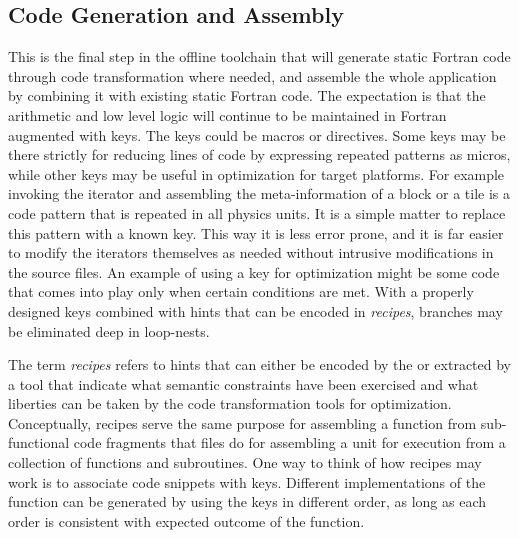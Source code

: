 \documentclass{article}
\begin{document}

\subsection{Code Generation and Assembly}
\label{sec:code-generation}

This is the final step in the offline toolchain that will generate
static Fortran code through code transformation where needed, and
assemble the whole application by combining it with existing static
Fortran code. The expectation is that the arithmetic and low level
logic will continue to be maintained in Fortran augmented with
keys. The keys could be macros or directives. Some keys may be there
strictly for reducing lines of code by expressing repeated patterns as
micros, while other keys may be useful in optimization for target
platforms. For example invoking the iterator and assembling the
meta-information of a block or a tile is a code pattern that is
repeated in all physics units. It is a simple matter to replace this
pattern with a known key. This way it is less error prone, and it is
far easier to modify the iterators themselves as needed without
intrusive modifications in the source files. An example of using a key
for optimization might be some code that comes into play only when
certain conditions are met. With a properly designed keys combined with
hints that can be encoded in {\it recipes}, branches may be eliminated
deep in loop-nests.

The term {\it recipes} refers to
hints that can either be encoded by the \PUD or extracted by a tool
that indicate what semantic constraints have been exercised and what
liberties can be taken by the code transformation tools for
optimization. Conceptually, recipes serve the same purpose for
assembling a function from sub-functional code fragments that
 files do for assembling a unit for execution from a
collection of functions and subroutines. One way to think of how
recipes may work is to associate code snippets with keys. Different
implementations of the function can be generated by using the keys in
different order, as long as each order is consistent with expected outcome of the
function.
\end{document}
